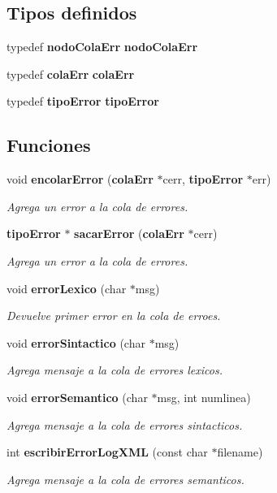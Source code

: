 \subsection*{Tipos definidos}
\begin{CompactItemize}
\item 
typedef {\bf nodo\-Cola\-Err} {\bf nodo\-Cola\-Err}
\item 
typedef {\bf cola\-Err} {\bf cola\-Err}
\item 
typedef {\bf tipo\-Error} {\bf tipo\-Error}
\end{CompactItemize}
\subsection*{Funciones}
\begin{CompactItemize}
\item 
void {\bf encolar\-Error} ({\bf cola\-Err} $\ast$cerr, {\bf tipo\-Error} $\ast$err)
\begin{CompactList}\small\item\em Agrega un error a la cola de errores. \item\end{CompactList}\item 
{\bf tipo\-Error} $\ast$ {\bf sacar\-Error} ({\bf cola\-Err} $\ast$cerr)
\begin{CompactList}\small\item\em Agrega un error a la cola de errores. \item\end{CompactList}\item 
void {\bf error\-Lexico} (char $\ast$msg)
\begin{CompactList}\small\item\em Devuelve primer error en la cola de erroes. \item\end{CompactList}\item 
void {\bf error\-Sintactico} (char $\ast$msg)
\begin{CompactList}\small\item\em Agrega mensaje a la cola de errores lexicos. \item\end{CompactList}\item 
void {\bf error\-Semantico} (char $\ast$msg, int numlinea)
\begin{CompactList}\small\item\em Agrega mensaje a la cola de errores sintacticos. \item\end{CompactList}\item 
int {\bf escribir\-Error\-Log\-XML} (const char $\ast$filename)
\begin{CompactList}\small\item\em Agrega mensaje a la cola de errores semanticos. \item\end{CompactList}\end{CompactItemize}
